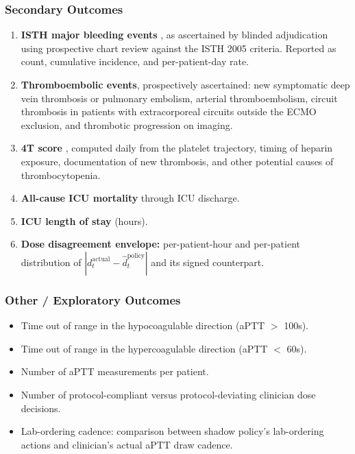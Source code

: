 \documentclass[11pt]{article}
\begin{document}
\subsubsection{Secondary Outcomes}

\begin{enumerate}
  \item \textbf{ISTH major bleeding events} \citep{schulman2005}, as ascertained by blinded adjudication using prospective chart review against the ISTH 2005 criteria. Reported as count, cumulative incidence, and per-patient-day rate.
  \item \textbf{Thromboembolic events}, prospectively ascertained: new symptomatic deep vein thrombosis or pulmonary embolism, arterial thromboembolism, circuit thrombosis in patients with extracorporeal circuits outside the ECMO exclusion, and thrombotic progression on imaging.
  \item \textbf{4T score} \citep{lo2006}, computed daily from the platelet trajectory, timing of heparin exposure, documentation of new thrombosis, and other potential causes of thrombocytopenia.
  \item \textbf{All-cause ICU mortality} through ICU discharge.
  \item \textbf{ICU length of stay} (hours).
  \item \textbf{Dose disagreement envelope:} per-patient-hour and per-patient distribution of $|d_t^{\mathrm{actual}} - \hat{d}_t^{\mathrm{policy}}|$ and its signed counterpart.
\end{enumerate}

\subsubsection{Other / Exploratory Outcomes}

\begin{itemize}
  \item Time out of range in the hypocoagulable direction (aPTT $>$ 100s).
  \item Time out of range in the hypercoagulable direction (aPTT $<$ 60s).
  \item Number of aPTT measurements per patient.
  \item Number of protocol-compliant versus protocol-deviating clinician dose decisions.
  \item Lab-ordering cadence: comparison between shadow policy's lab-ordering actions and clinician's actual aPTT draw cadence.
\end{itemize}
\end{document}
